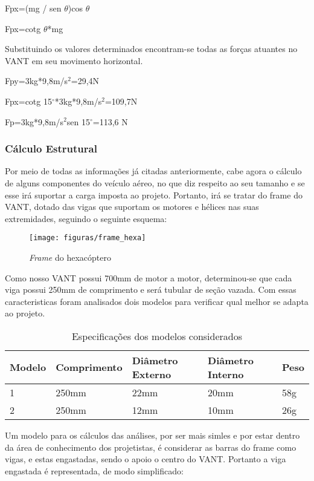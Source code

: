 \begin{center}
Fpx=(mg / sen $\theta$)cos $\theta$

Fpx=cotg $\theta$*mg
\end{center}

Substituindo os valores determinados encontram-se todas as forças atuantes no VANT em seu movimento horizontal.

\begin{center}
Fpy=3kg*9,8m/s$^{2}$=29,4N

Fpx=cotg 15$^{\circ}$*3kg*9,8m/s$^{2}$=109,7N

Fp=3kg*9,8m/s$^{2}$sen 15$^{\circ}$=113,6 N
\end{center}

\subsubsection{Cálculo Estrutural}

Por meio de todas as informações já citadas anteriormente, cabe agora o cálculo de alguns componentes do veículo aéreo, no que diz respeito ao seu tamanho e se esse irá suportar a carga imposta ao projeto. Portanto, irá se tratar do frame do VANT, dotado das vigas que suportam os motores e hélices nas suas extremidades, seguindo o seguinte esquema:

\begin{figure}[H]
\centering\texttt{[image: figuras/frame\_hexa]}
\caption{\textit{Frame} do hexacóptero}
\end{figure}

Como nosso VANT possui 700mm de motor a motor, determinou-se  que cada viga possui 250mm de comprimento e será tubular de seção vazada. Com essas caracteristicas foram analisados dois modelos para verificar qual melhor se adapta ao projeto.

\begin{table}[H]
\centering
\begin{tabular}{|l|l|l|l|l|}
\hline
\textbf{Modelo} & \textbf{Comprimento} & \textbf{Diâmetro Externo} & \textbf{Diâmetro Interno} & \textbf{Peso} \\ \hline
1 & 250mm & 22mm & 20mm & 58g \\ \hline
2 & 250mm & 12mm & 10mm & 26g \\ \hline
\end{tabular}
\caption{Especificações dos modelos considerados}
\end{table}

Um modelo para os cálculos das análises, por ser mais simles e por estar dentro da área de conhecimento dos projetistas, é considerar as barras do frame como vigas, e estas engastadas, sendo o apoio o centro do VANT. Portanto a viga engastada é representada, de modo simplificado:

